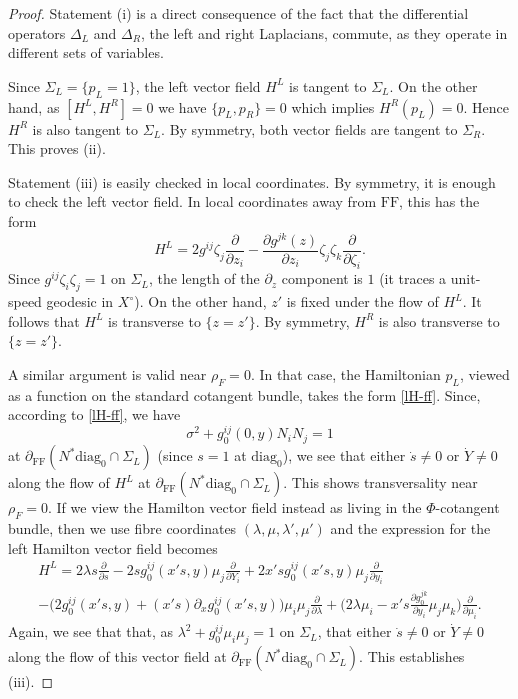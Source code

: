 \documentclass[10pt, a4paper, twoside]{amsart}
\numberwithin{equation}{section}
\theoremstyle{remark}
\begin{document}
\begin{proof}
Statement (i)  is a direct consequence of the fact that the differential operators $\Delta_L$ and $\Delta_R$, the left and right Laplacians, commute, as they operate in different sets of variables.

Since $\Sigma_L = \{ p_L = 1 \}$, the left vector field $H^L$ is tangent to $\Sigma_L$. On the other hand, as $[H^L, H^R] = 0$ we have $\{ p_L, p_R\} = 0$ which implies $H^R(p_L) = 0$. Hence $H^R$ is also tangent to $\Sigma_L$. By symmetry, both vector fields are tangent to $\Sigma_R$. This proves (ii).

Statement (iii) is
easily checked in local coordinates. By symmetry, it is enough to check the left vector field. In local coordinates away from ${\mathrm{FF}}$, this has the form
\begin{equation}
H^L = 2 g^{ij} \zeta_j \frac{\partial}{\partial z_i} - \frac{\partial g^{jk}(z)}{\partial z_i} \zeta_j \zeta_k \frac{\partial}{\partial \zeta_i}.
\label{lhvf}\end{equation}
Since $g^{ij} \zeta_i \zeta_j = 1$ on $\Sigma_L$, the length of the $\partial_z$ component is $1$ (it traces a unit-speed geodesic in $X^\circ$). On the other hand, $z'$ is fixed under the flow of $H^L$. It follows that $H^L$ is transverse to $\{ z = z'\}$. By symmetry, $H^R$ is also transverse to $\{ z = z'\}$.

A similar argument is valid near $\rho_F = 0$. In that case, the Hamiltonian $p_L$, viewed as a function on the standard cotangent bundle,  takes the form \eqref{lH-ff}. Since, according to \eqref{lH-ff}, we have
$$
\sigma^2 + g_0^{ij}(0, y) N_i N_j = 1
$$
at $\partial_{\mathrm{FF}} (N^* {\mathrm{diag}_0} \cap \Sigma_L)$ (since $s=1$ at ${\mathrm{diag}_0}$), we see that either $\dot s \neq 0$ or $\dot Y \neq 0$ along the flow of $H^L$ at $\partial_{\mathrm{FF}} (N^* {\mathrm{diag}_0} \cap \Sigma_L)$. This shows transversality near $\rho_F = 0$. If we view the Hamilton vector field instead as living in the $\Phi$-cotangent bundle, then we use fibre coordinates $(\lambda, \mu, \lambda', \mu')$ and the expression for the left Hamilton vector field becomes
\begin{equation}\begin{gathered}
H^L = 2 \lambda s \frac{\partial}{\partial s} - 2s g_0^{ij}(x's, y) \mu_j\frac{\partial}{\partial Y_i} + 2x's g_0^{ij}(x's, y) \mu_j\frac{\partial}{\partial y_i} \\
- \Big( 2g_0^{ij}(x's, y) + (x's) \partial_x g_0^{ij}(x's, y) \Big) \mu_i \mu_j \frac{\partial}{\partial \lambda}
+ \Big( 2\lambda \mu_i - x' s \frac{\partial g_0^{jk}}{\partial y_i} \mu_j \mu_k \Big) \frac{\partial}{\partial \mu_i} .
\end{gathered}\label{lHvf-ff-0}\end{equation}
Again, we see that that, as $\lambda^2 + g_0^{ij} \mu_i \mu_j = 1$ on $\Sigma_L$, that  either $\dot s \neq 0$ or $\dot Y \neq 0$ along the flow of this vector field at $\partial_{\mathrm{FF}} (N^* {\mathrm{diag}_0} \cap \Sigma_L)$. This establishes (iii).


\end{proof}
\end{document}
